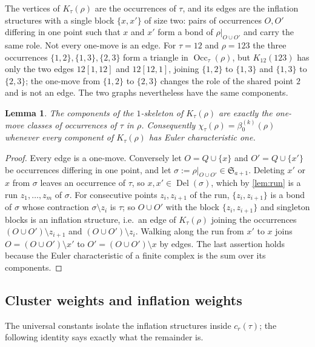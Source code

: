 \documentclass[11pt,reqno]{amsart}
\theoremstyle{plain}
\newtheorem{lemma}[lemma]{Lemma}
\theoremstyle{definition}
\theoremstyle{remark}
\newcommand{\Del}{\operatorname{Del}}
\newcommand{\Occ}{\operatorname{Occ}}
\newcommand{\Sym}{\mathfrak{S}}
\newcommand{\bz}{\beta_0}
\begin{document}
The vertices of $K_\tau(\rho)$ are the occurrences of $\tau$, and its edges are the inflation structures with a single block $\{x,x'\}$ of size two: pairs of occurrences $O,O'$ differing in one point such that $x$ and $x'$ form a bond of $\rho|_{O\cup O'}$ and carry the same role. Not every one-move is an edge. For $\tau=12$ and $\rho=123$ the three occurrences $\{1,2\},\{1,3\},\{2,3\}$ form a triangle in $\Occ_\tau(\rho)$, but $K_{12}(123)$ has only the two edges $12[1,12]$ and $12[12,1]$, joining $\{1,2\}$ to $\{1,3\}$ and $\{1,3\}$ to $\{2,3\}$; the one-move from $\{1,2\}$ to $\{2,3\}$ changes the role of the shared point $2$ and is not an edge. The two graphs nevertheless have the same components.

\begin{lemma}\label{lem:skeleton}
The components of the $1$-skeleton of $K_\tau(\rho)$ are exactly the one-move classes of occurrences of $\tau$ in $\rho$. Consequently $\chi_\tau(\rho)=\bz^{(k)}(\rho)$ whenever every component of $K_\tau(\rho)$ has Euler characteristic one.
\end{lemma}

\begin{proof}
Every edge is a one-move. Conversely let $O=Q\cup\{x\}$ and $O'=Q\cup\{x'\}$ be occurrences differing in one point, and let $\sigma:=\rho|_{O\cup O'}\in\Sym_{a+1}$. Deleting $x'$ or $x$ from $\sigma$ leaves an occurrence of $\tau$, so $x,x'\in\Del(\sigma)$, which by \cref{lem:run} is a run $z_1,\dots,z_m$ of $\sigma$. For consecutive points $z_i,z_{i+1}$ of the run, $\{z_i,z_{i+1}\}$ is a bond of $\sigma$ whose contraction $\sigma\setminus z_i$ is $\tau$; so $O\cup O'$ with the block $\{z_i,z_{i+1}\}$ and singleton blocks is an inflation structure, i.e.\ an edge of $K_\tau(\rho)$ joining the occurrences $(O\cup O')\setminus z_{i+1}$ and $(O\cup O')\setminus z_i$. Walking along the run from $x'$ to $x$ joins $O=(O\cup O')\setminus x'$ to $O'=(O\cup O')\setminus x$ by edges. The last assertion holds because the Euler characteristic of a finite complex is the sum over its components.
\end{proof}

\subsection{Cluster weights and inflation weights}
The universal constants isolate the inflation structures inside $c_r(\tau)$; the following identity says exactly what the remainder is.
\end{document}
